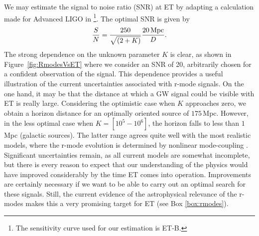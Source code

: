 We may estimate the signal to noise ratio (SNR) at ET by adapting 
a calculation made for Advanced LIGO in \cite {SaTome1}\footnote{The 
sensitivity curve used for our estimation is ET-B.}. The optimal 
SNR is given by
\begin{equation}
\frac{S}{N}=\frac{250}{\sqrt{(2+K)}}\frac{20\,{\rm Mpc}}{D}.
\end{equation}
The strong dependence on the unknown parameter $K$ is clear, as 
shown in Figure~\ref{fig:RmodesVsET} where we consider an SNR 
of 20, arbitrarily chosen for a confident observation of the 
signal. This dependence provides a useful illustration of the current uncertainties 
associated with r-mode signals. On the one hand, it may be 
that the distance
at which a GW signal could be visible with ET is really large. Considering 
the optimistic case when $K$ approaches zero, we obtain a horizon 
distance for an optimally oriented source of $175\,$Mpc. However, 
in the less optimal case when $K=[10^{5}-10^{6}]$, the 
horizon falls to less than $1\,$Mpc (galactic sources). The latter 
range agrees quite well with the most realistic models, where the 
r-mode evolution is determined by nonlinear mode-coupling \cite{Bondarescu:2009}.
Significant uncertainties remain, as all current models are somewhat incomplete, but 
there is every reason to expect that our understanding of the 
physics would have improved considerably by the time ET comes into operation.
Improvements are certainly necessary if we want to be able to carry out
an optimal search for these signals. Still, the current evidence of the astrophysical 
relevance of the r-modes makes this a very promising target 
for ET (see Box \ref{box:rmodes}).


